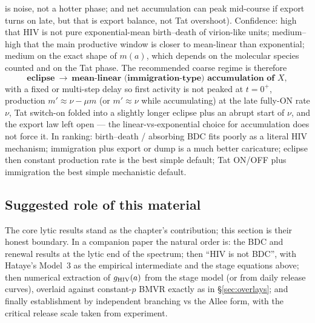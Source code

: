 is noise, not a hotter phase; and net accumulation can peak mid-course if
export turns on late, but that is export balance, not Tat overshoot).
Confidence: high that HIV is not pure exponential-mean birth--death of
virion-like units; medium--high that the main productive window is closer
to mean-linear than exponential; medium on the exact shape of $m(a)$, which
depends on the molecular species counted and on the Tat phase. The
recommended coarse regime is therefore
\begin{equation}
\textbf{eclipse}\ \longrightarrow\
\textbf{mean-linear (immigration-type) accumulation of }X,
\end{equation}
with a fixed or multi-step delay so first activity is not peaked at
$t=0^+$, production $m'\approx\nu-\mu m$ (or $m'\approx\nu$ while
accumulating) at the late fully-ON rate $\nu$, Tat switch-on folded into a
slightly longer eclipse plus an abrupt start of $\nu$, and the export law
left open --- the linear-vs-exponential choice for accumulation does not
force it. In ranking: birth--death / absorbing BDC fits poorly as a literal
HIV mechanism; immigration plus export or dump is a much better caricature;
eclipse then constant production rate is the best simple default; Tat ON/OFF
plus immigration the best simple mechanistic default.

\subsection{Suggested role of this material}

The core lytic results stand as the chapter's contribution; this section is
their honest boundary. In a companion paper the natural order is: the BDC
and renewal results at the lytic end of the spectrum; then ``HIV is not
BDC'', with Hataye's Model~3 as the empirical intermediate and the stage
equations above; then numerical extraction of $g_{\rm HIV}(a)$ from the
stage model (or from daily release curves), overlaid against constant-$p$
BMVR exactly as in \S\ref{sec:overlays}; and finally establishment by
independent branching vs the Allee form, with the critical release scale
taken from experiment.
